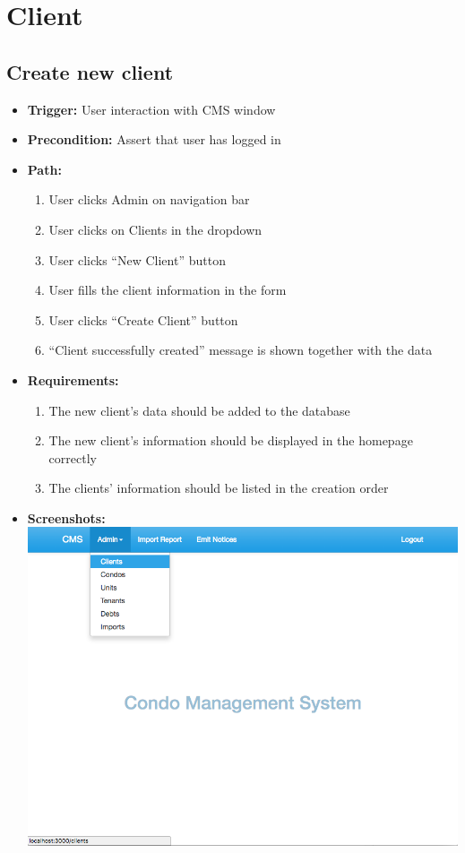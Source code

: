 \section*{Client}

\subsection*{Create new client}

\begin{itemize}
  \item[] \textbf{Trigger:} User interaction with CMS window
  \item[] \textbf{Precondition:} Assert that user has logged in
  \item[] \textbf{Path:}
    \begin{enumerate}
      \item User clicks Admin on navigation bar
      \item User clicks on Clients in the dropdown
      \item User clicks ``New Client'' button
      \item User fills the client information in the form
      \item User clicks ``Create Client'' button
      \item ``Client successfully created'' message is shown together with the data
    \end{enumerate}
  \item[] \textbf{Requirements:}
    \begin{enumerate}
      \item The new client's data should be added to the database
      \item The new client's information should be displayed in the homepage correctly
      \item The clients' information should be listed in the creation order
    \end{enumerate}
  \item[] \textbf{Screenshots:} \\
    \includegraphics[scale=0.25]{./images/ss/client/create/1.png}

\end{itemize}
